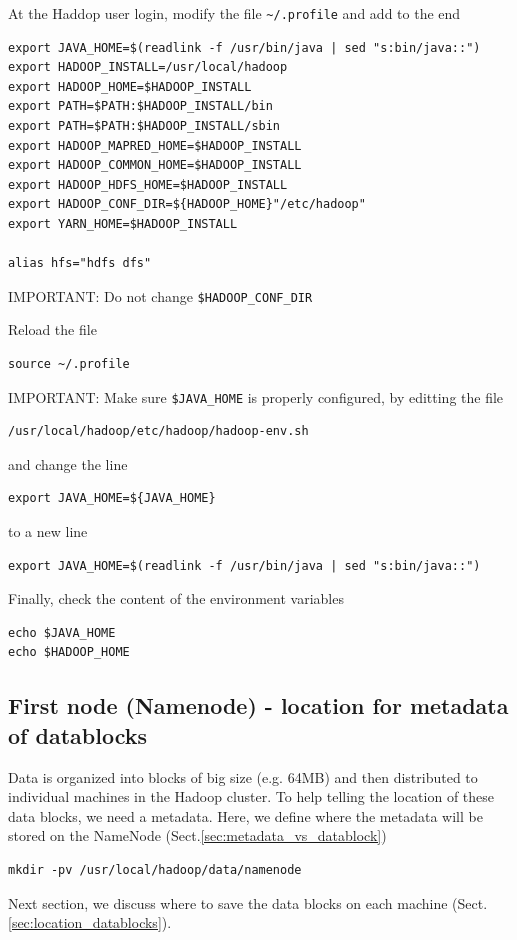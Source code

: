 At the Haddop user login, modify the file \verb!~/.profile! and add to the end

\begin{verbatim}
export JAVA_HOME=$(readlink -f /usr/bin/java | sed "s:bin/java::")
export HADOOP_INSTALL=/usr/local/hadoop
export HADOOP_HOME=$HADOOP_INSTALL
export PATH=$PATH:$HADOOP_INSTALL/bin
export PATH=$PATH:$HADOOP_INSTALL/sbin
export HADOOP_MAPRED_HOME=$HADOOP_INSTALL
export HADOOP_COMMON_HOME=$HADOOP_INSTALL
export HADOOP_HDFS_HOME=$HADOOP_INSTALL
export HADOOP_CONF_DIR=${HADOOP_HOME}"/etc/hadoop"
export YARN_HOME=$HADOOP_INSTALL

alias hfs="hdfs dfs"
\end{verbatim}
IMPORTANT: Do not change \verb!$HADOOP_CONF_DIR!

Reload the file
\begin{verbatim}
source ~/.profile
\end{verbatim}

IMPORTANT: Make sure \verb!$JAVA_HOME! is properly configured, by editting the
file
\begin{verbatim}
/usr/local/hadoop/etc/hadoop/hadoop-env.sh
\end{verbatim}
and change the line
\begin{verbatim}
export JAVA_HOME=${JAVA_HOME}
\end{verbatim}
to a new line
\begin{verbatim}
export JAVA_HOME=$(readlink -f /usr/bin/java | sed "s:bin/java::")
\end{verbatim}

Finally, check the content of the environment variables
\begin{verbatim}
echo $JAVA_HOME
echo $HADOOP_HOME
\end{verbatim}

\subsection{First node (Namenode) - location for metadata of datablocks}

Data is organized into blocks of big size (e.g. 64MB) and then distributed to
individual machines in the Hadoop cluster. To help telling the location of these
data blocks, we need a metadata. Here, we define where the metadata will be
stored on the NameNode (Sect.\ref{sec:metadata_vs_datablock})
\begin{verbatim}
mkdir -pv /usr/local/hadoop/data/namenode
\end{verbatim}
Next section, we discuss where to save the data blocks on each machine
(Sect.\ref{sec:location_datablocks}).

